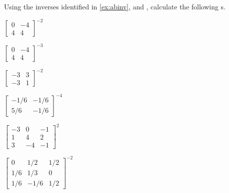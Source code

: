 \begin{exercise} \label{ex:} 
Using the inverses identified in \autoref{ex:abinv}, and , calculate the following s.
\begin{parts}
\item \(\begin{bmatrix} 0&-4\\4&4 \end{bmatrix}^{-2}\)

\item \(\begin{bmatrix} 0&-4\\4&4 \end{bmatrix}^{-3}\)

\item \(\begin{bmatrix} -3&3
\\-3&1 \end{bmatrix}^{-2}\)

\item \(\begin{bmatrix} -1/6&-1/6
\\5/6&-1/6 \end{bmatrix}^{-4}\)

\item \(\begin{bmatrix} -3&0&-1
\\1&4&2
\\3&-4&-1 \end{bmatrix}^2\)

\item \(\begin{bmatrix} 0&1/2&1/2
\\1/6&1/3&0
\\1/6&-1/6&1/2 \end{bmatrix}^{-2}\)


\end{parts}
\end{exercise}
